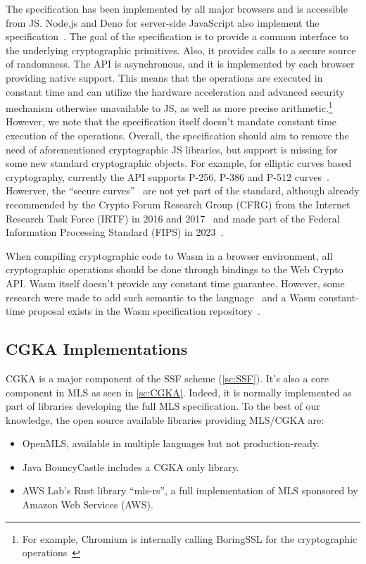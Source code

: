 The specification has been implemented by all major browsers
and is accessible from JS. 
Node.js and Deno for server-side JavaScript also implement the specification~\cite{NodeJsWebCryptoAPI, DenoWebCryptoAPI}.
The goal of the specification
is to provide a common interface to the underlying 
cryptographic primitives. Also, it provides calls to
a secure source of randomness. 
The API is asynchronous, and it is implemented by each
browser providing native support. This means that the
operations are executed in constant time and can
utilize the hardware acceleration and advanced
security mechanism otherwise unavailable to JS, as well as
more precise arithmetic.\footnote{For example, Chromium is internally calling BoringSSL for the cryptographic operations~\cite{ChromiumWebCryptoAPIImplementation}}
However, we note that the specification itself doesn't mandate
constant time execution of the operations.
Overall, the specification should aim to 
remove the need of aforementioned cryptographic JS libraries,
but support is missing for some new standard cryptographic objects. 
For example, for elliptic curves based cryptography, currently
the API supports P-256, P-386 and P-512 curves~\cite{WebCryptoAPICurvesSupport}.
Howerver, the ``secure curves''~\cite{WebCryptoAPISecureCurvesDraft,WebCryptoAPISecureCurvesExplainer}
are not yet part of the standard, although already recommended by
the Crypto Forum Research Group (CFRG) from the Internet Research
Task Force (IRTF) in 2016 and 2017~\cite{RFC7748IRTF, RFC8032IRTF}
and made part of the Federal Information Processing Standard (FIPS) in 2023~\cite{SecureCurvesNIST}.

When compiling cryptographic code to Wasm in a browser environment,
all cryptographic operations should be done through bindings to
the Web Crypto API. Wasm itself doesn't provide any constant time
guarantee. However, some research were made to add such semantic
to the language~\cite{CTWasm, gu2023constanttimewasmtimerealtime}
and a Wasm constant-time proposal exists in the Wasm specification
repository~\cite{WasmCTProposal}.

\subsection{CGKA Implementations}\label{sc:CGKA-implementations}

CGKA is a major component of the SSF scheme (\cref{sc:SSF}).
It's also a core component in MLS as seen in \cref{sc:CGKA}.
Indeed, it is normally implemented as part of libraries developing
the full MLS specification.
To the best of our knowledge, the open source available libraries
providing MLS/CGKA are:
\begin{itemize}
    \item OpenMLS, available in multiple languages but not production-ready.
    \item Java BouncyCastle includes a CGKA only library.
    \item AWS Lab's Rust library ``mls-rs'', a full implementation of MLS sponsored by Amazon Web Services (AWS). 
\end{itemize}

